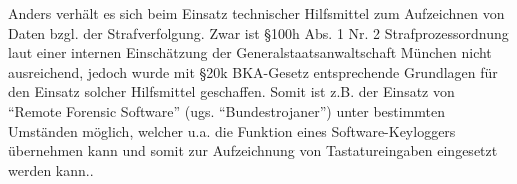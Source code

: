 Anders verhält es sich beim Einsatz technischer Hilfsmittel zum Aufzeichnen von Daten bzgl. der Strafverfolgung. Zwar ist \S 100h Abs. 1 Nr. 2 Strafprozessordnung \cite{stpo} laut einer internen Einschätzung der Generalstaatsanwaltschaft München \cite{munich} nicht ausreichend, jedoch wurde mit \S 20k BKA-Gesetz \cite{bkag} entsprechende Grundlagen für den Einsatz solcher Hilfsmittel geschaffen. Somit ist z.B. der Einsatz von ``Remote Forensic Software'' (ugs. ``Bundestrojaner'') unter bestimmten Umständen möglich, welcher u.a. die Funktion eines Software-Keyloggers übernehmen kann und somit zur Aufzeichnung von Tastatureingaben eingesetzt werden kann.\cite{spd}.